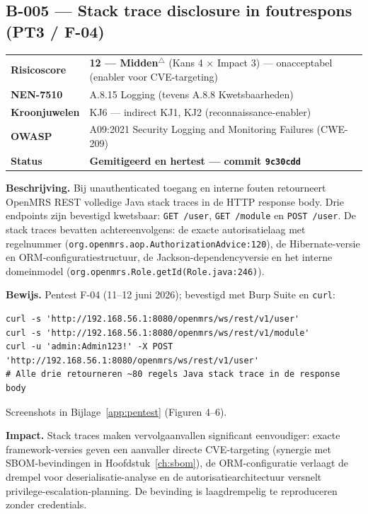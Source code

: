 \documentclass[12pt, a4paper]{report}
\newcommand{\amber}[1]{\textcolor{ragAmber}{\textbf{#1}}}
\newcommand{\groen}[1]{\textcolor{ragGreen}{\textbf{#1}}}
\begin{document}
\subsection{B-005 --- Stack trace disclosure in foutrespons (PT3 / F-04)}
\label{sec:b005}

\begin{tabular}{@{}l >{\raggedright\arraybackslash}p{11.4cm}@{}}
\textbf{Risicoscore} & \amber{12 --- Midden}$^\triangle$ (Kans 4 $\times$ Impact 3) --- onacceptabel (enabler voor CVE-targeting) \\
\textbf{NEN-7510}    & A.8.15 Logging (tevens A.8.8 Kwetsbaarheden) \\
\textbf{Kroonjuwelen}& KJ6 --- indirect KJ1, KJ2 (reconnaissance-enabler) \\
\textbf{OWASP}       & A09:2021 Security Logging and Monitoring Failures (CWE-209) \\
\textbf{Status}      & \groen{Gemitigeerd en hertest --- commit \texttt{9c30cdd}} \\
\end{tabular}

\textbf{Beschrijving.} Bij unauthenticated toegang en interne fouten retourneert
OpenMRS REST volledige Java stack traces in de HTTP response body. Drie endpoints
zijn bevestigd kwetsbaar: \texttt{GET /user}, \texttt{GET /module} en
\texttt{POST /user}. De stack traces bevatten achtereenvolgens: de exacte
autorisatielaag met regelnummer (\texttt{org.openmrs.aop.AuthorizationAdvice:120}),
de Hibernate-versie en ORM-configuratiestructuur, de Jackson-dependencyversie en
het interne domeinmodel (\texttt{org.openmrs.Role.getId(Role.java:246)}).

\textbf{Bewijs.} Pentest F-04 (11--12 juni 2026); bevestigd met Burp Suite en
\texttt{curl}:
\begin{lstlisting}[basicstyle=\ttfamily\scriptsize, breaklines=true, frame=single]
curl -s 'http://192.168.56.1:8080/openmrs/ws/rest/v1/user'
curl -s 'http://192.168.56.1:8080/openmrs/ws/rest/v1/module'
curl -u 'admin:Admin123!' -X POST 'http://192.168.56.1:8080/openmrs/ws/rest/v1/user'
# Alle drie retourneren ~80 regels Java stack trace in de response body
\end{lstlisting}
Screenshots in Bijlage~\ref{app:pentest} (Figuren 4--6).

\textbf{Impact.} Stack traces maken vervolgaanvallen significant eenvoudiger:
exacte framework-versies geven een aanvaller directe CVE-targeting (synergie met
SBOM-bevindingen in Hoofdstuk~\ref{ch:sbom}), de ORM-configuratie verlaagt de
drempel voor deserialisatie-analyse en de autorisatiearchitectuur versnelt
privilege-escalation-planning. De bevinding is laagdrempelig te reproduceren
zonder credentials.
\end{document}
